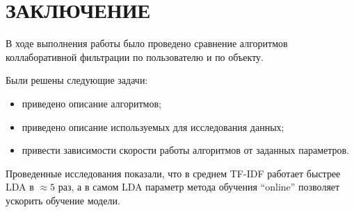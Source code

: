 \section*{ЗАКЛЮЧЕНИЕ}
В ходе выполнения работы было проведено сравнение алгоритмов коллаборативной фильтрации по пользователю и по объекту.

Были решены следующие задачи:
\begin{itemize}
	\item приведено описание алгоритмов;
	\item приведено описание используемых для исследования данных;
	\item привести зависимости скорости работы алгоритмов от заданных параметров.
\end{itemize}

Проведенные исследования показали, что в среднем TF-IDF работает быстрее LDA в $\approx5$ раз, а в самом LDA параметр метода обучения ``online'' позволяет ускорить обучение модели.

\pagebreak